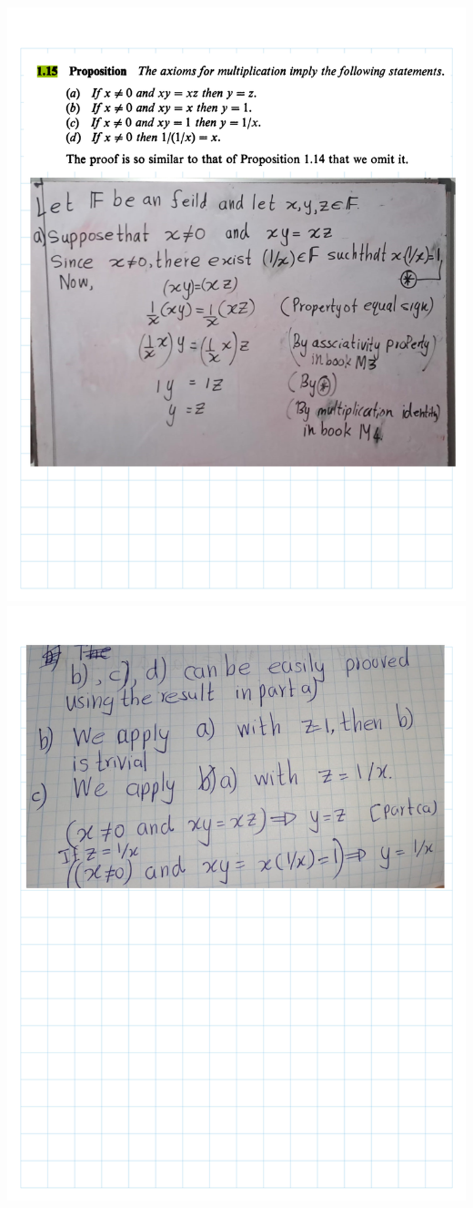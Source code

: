 \documentclass[
]{book}
\theoremstyle{definition}
\theoremstyle{definition}
\theoremstyle{definition}
\theoremstyle{definition}
\theoremstyle{remark}
\begin{document}
\includegraphics{Figures/Ex-1/Rudin-Ex (1).png}
\includegraphics{Figures/Ex-1/Rudin-Ex (2).png}
\end{document}
